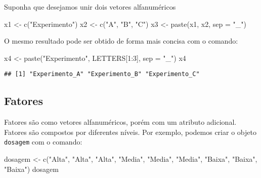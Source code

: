 \documentclass[
]{book}
\newenvironment{Shaded}{\begin{snugshade}}{\end{snugshade}}
\newcommand{\AttributeTok}[1]{\textcolor[rgb]{0.77,0.63,0.00}{#1}}
\newcommand{\DecValTok}[1]{\textcolor[rgb]{0.00,0.00,0.81}{#1}}
\newcommand{\FunctionTok}[1]{\textcolor[rgb]{0.00,0.00,0.00}{#1}}
\newcommand{\NormalTok}[1]{#1}
\newcommand{\OtherTok}[1]{\textcolor[rgb]{0.56,0.35,0.01}{#1}}
\newcommand{\SpecialCharTok}[1]{\textcolor[rgb]{0.00,0.00,0.00}{#1}}
\newcommand{\StringTok}[1]{\textcolor[rgb]{0.31,0.60,0.02}{#1}}
\begin{document}
Suponha que desejamos unir dois vetores alfanuméricos

\begin{Shaded}
\begin{Highlighting}[]
\NormalTok{x1 }\OtherTok{\textless{}{-}} \FunctionTok{c}\NormalTok{(}\StringTok{"Experimento"}\NormalTok{)}
\NormalTok{x2 }\OtherTok{\textless{}{-}} \FunctionTok{c}\NormalTok{(}\StringTok{"A"}\NormalTok{, }\StringTok{"B"}\NormalTok{, }\StringTok{"C"}\NormalTok{)}
\NormalTok{x3 }\OtherTok{\textless{}{-}} \FunctionTok{paste}\NormalTok{(x1, x2, }\AttributeTok{sep =} \StringTok{"\_"}\NormalTok{)}
\end{Highlighting}
\end{Shaded}

O mesmo resultado pode ser obtido de forma mais concisa com o comando:

\begin{Shaded}
\begin{Highlighting}[]
\NormalTok{x4 }\OtherTok{\textless{}{-}} \FunctionTok{paste}\NormalTok{(}\StringTok{"Experimento"}\NormalTok{, LETTERS[}\DecValTok{1}\SpecialCharTok{:}\DecValTok{3}\NormalTok{], }\AttributeTok{sep =} \StringTok{"\_"}\NormalTok{)}
\NormalTok{x4}
\end{Highlighting}
\end{Shaded}

\begin{verbatim}
## [1] "Experimento_A" "Experimento_B" "Experimento_C"
\end{verbatim}

\hypertarget{fatores}{%
\subsection{Fatores}\label{fatores}}

Fatores são como vetores alfanuméricos, porém com um atributo adicional. Fatores são compostos por diferentes níveis. Por exemplo, podemos criar o objeto \texttt{dosagem} com o comando:

\begin{Shaded}
\begin{Highlighting}[]
\NormalTok{dosagem }\OtherTok{\textless{}{-}} \FunctionTok{c}\NormalTok{(}\StringTok{"Alta"}\NormalTok{, }\StringTok{"Alta"}\NormalTok{, }\StringTok{"Alta"}\NormalTok{, }
            \StringTok{"Media"}\NormalTok{, }\StringTok{"Media"}\NormalTok{, }\StringTok{"Media"}\NormalTok{, }
            \StringTok{"Baixa"}\NormalTok{, }\StringTok{"Baixa"}\NormalTok{, }\StringTok{"Baixa"}\NormalTok{)}
\NormalTok{dosagem}
\end{Highlighting}
\end{Shaded}
\end{document}
